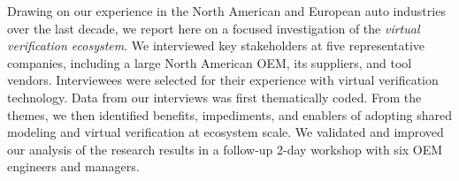 
Drawing on our experience in the North American and European auto industries over the last decade, we report here on a focused investigation of the \emph{virtual verification ecosystem}.
We interviewed key stakeholders at five representative companies, including a large North American OEM, its suppliers, and tool vendors.
Interviewees were selected for their experience with virtual verification technology.
Data from our interviews was first thematically coded.
From the themes, we then identified benefits, impediments, and enablers of adopting shared modeling and virtual verification at ecosystem scale.
We validated and improved our analysis of the research results in a follow-up 2-day workshop with six OEM engineers and managers.

